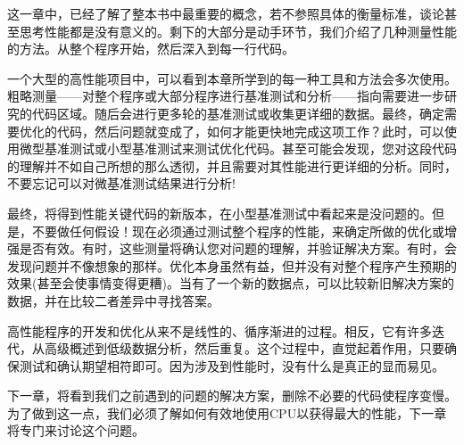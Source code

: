 这一章中，已经了解了整本书中最重要的概念，若不参照具体的衡量标准，谈论甚至思考性能都是没有意义的。剩下的大部分是动手环节，我们介绍了几种测量性能的方法。从整个程序开始，然后深入到每一行代码。

一个大型的高性能项目中，可以看到本章所学到的每一种工具和方法会多次使用。粗略测量——对整个程序或大部分程序进行基准测试和分析——指向需要进一步研究的代码区域。随后会进行更多轮的基准测试或收集更详细的数据。最终，确定需要优化的代码，然后问题就变成了，如何才能更快地完成这项工作？此时，可以使用微型基准测试或小型基准测试来测试优化代码。甚至可能会发现，您对这段代码的理解并不如自己所想的那么透彻，并且需要对其性能进行更详细的分析。同时，不要忘记可以对微基准测试结果进行分析!

最终，将得到性能关键代码的新版本，在小型基准测试中看起来是没问题的。但是，不要做任何假设！现在必须通过测试整个程序的性能，来确定所做的优化或增强是否有效。有时，这些测量将确认您对问题的理解，并验证解决方案。有时，会发现问题并不像想象的那样。优化本身虽然有益，但并没有对整个程序产生预期的效果(甚至会使事情变得更糟)。当有了一个新的数据点，可以比较新旧解决方案的数据，并在比较二者差异中寻找答案。

高性能程序的开发和优化从来不是线性的、循序渐进的过程。相反，它有许多迭代，从高级概述到低级数据分析，然后重复。这个过程中，直觉起着作用，只要确保测试和确认期望相符即可。因为涉及到性能时，没有什么是真正的显而易见。

下一章，将看到我们之前遇到的问题的解决方案，删除不必要的代码使程序变慢。为了做到这一点，我们必须了解如何有效地使用CPU以获得最大的性能，下一章将专门来讨论这个问题。